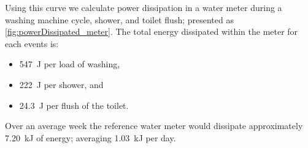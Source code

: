     Using this curve we calculate power dissipation in a water meter during a washing machine cycle, shower, and toilet flush; presented as \cref{fig:powerDissipated_meter}.
    The total energy dissipated within the meter for each events is:
    \begin{itemize}
    \item \SI{547}{\joule} per load of washing,
    \item \SI{222}{\joule} per shower, and
    \item \SI{24.3}{\joule} per flush of the toilet.
    \end{itemize}


    Over an average week the reference water meter would dissipate approximately \SI{7.20}{\kilo\joule} of energy; averaging \SI{1.03}{\kilo\joule} per day.


